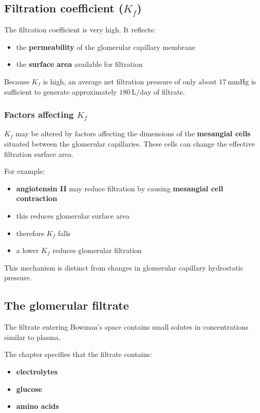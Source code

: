 \documentclass[11pt,a4paper]{article}
\begin{document}
\subsection{Filtration coefficient (\texorpdfstring{$K_f$}{Kf})}

The filtration coefficient is very high. It reflects:
\begin{itemize}
    \item the \textbf{permeability} of the glomerular capillary membrane
    \item the \textbf{surface area} available for filtration
\end{itemize}

Because \(K_f\) is high, an average net filtration pressure of only about \(17\ \text{mmHg}\) is sufficient to generate approximately \(180\ \text{L/day}\) of filtrate.

\subsubsection{Factors affecting \texorpdfstring{$K_f$}{Kf}}

\(K_f\) may be altered by factors affecting the dimensions of the \textbf{mesangial cells} situated between the glomerular capillaries. These cells can change the effective filtration surface area.

For example:
\begin{itemize}
    \item \textbf{angiotensin II} may reduce filtration by causing \textbf{mesangial cell contraction}
    \item this reduces glomerular surface area
    \item therefore \(K_f\) falls
    \item a lower \(K_f\) reduces glomerular filtration
\end{itemize}

This mechanism is distinct from changes in glomerular capillary hydrostatic pressure.

\subsection{The glomerular filtrate}

The filtrate entering Bowman’s space contains small solutes in concentrations similar to plasma.

The chapter specifies that the filtrate contains:
\begin{itemize}
    \item \textbf{electrolytes}
    \item \textbf{glucose}
    \item \textbf{amino acids}
\end{itemize}
\end{document}
